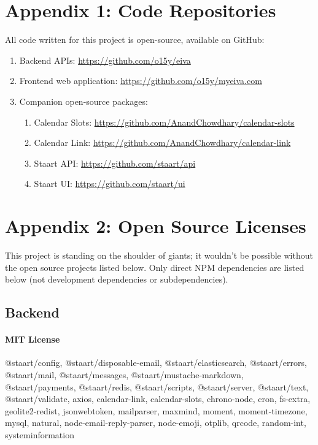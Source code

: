 \documentclass{article}
\begin{document}
\newpage

\cleardoublepage
{}
\setcounter{page}{\thesavepage}

\section*{Appendix 1: Code Repositories}

All code written for this project is open-source, available on GitHub:

\begin{enumerate}
	\item Backend APIs: \url{https://github.com/o15y/eiva}
	\item Frontend web application: \url{https://github.com/o15y/myeiva.com}
	\item Companion open-source packages:
	      \begin{enumerate}
	      	\item Calendar Slots: \url{https://github.com/AnandChowdhary/calendar-slots}
	      	\item Calendar Link: \url{https://github.com/AnandChowdhary/calendar-link}
	      	\item Staart API: \url{https://github.com/staart/api}
	      	\item Staart UI: \url{https://github.com/staart/ui}
	      \end{enumerate}
\end{enumerate}

\newpage

\section*{Appendix 2: Open Source Licenses}

This project is standing on the shoulder of giants; it wouldn't be possible without the open source projects listed below. Only direct NPM dependencies are listed below (not development dependencies or subdependencies).

\subsection*{Backend}

\paragraph{MIT License} @staart/config, @staart/disposable-email, @staart/elasticsearch, @staart/errors, @staart/mail, @staart/messages, @staart/mustache-markdown, @staart/payments, @staart/redis, @staart/scripts, @staart/server, @staart/text, @staart/validate, axios, calendar-link, calendar-slots, chrono-node, cron, fs-extra, geolite2-redist, jsonwebtoken, mailparser, maxmind, moment, moment-timezone, mysql, natural, node-email-reply-parser, node-emoji, otplib, qrcode, random-int, systeminformation
\end{document}
